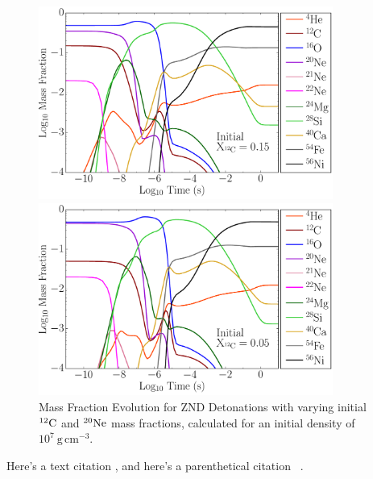 \documentclass[iop,apj]{emulateapj}
\newcommand{\C}[1]{\ensuremath{{}^{#1}{\rm C}}}
\newcommand{\Ne}[1]{\ensuremath{{}^{#1}{\rm Ne}}}
\newcommand{\unitspace}{\ensuremath{\,}}
\newcommand{\usp}{\unitspace}
\newcommand{\unitstyle}[1]{\ensuremath{\mathrm{#1}}}
\newcommand{\power}[2]{\ensuremath{{#1}^{#2}}}
\newcommand{\centi}{\unitstyle{c}}
\newcommand{\meter}{\unitstyle{m}}
\newcommand{\cm}{\centi\meter}
\newcommand{\gram}{\unitstyle{g}}
\newcommand{\grampercc}{\gram\usp\power{\cm}{-3}} %
\begin{document}
\begin{figure}[t]
	\hfill
	\begin{minipage}{0.5\textwidth}
		\includegraphics[width=0.86\textwidth]{figures/samples/XvsT_wn_35_XC-15.pdf}
	\end{minipage}
	\hfill
	\begin{minipage}{0.5\textwidth}
		\includegraphics[width=0.86\textwidth]{figures/samples/XvsT_wn_45_XC-05.pdf}
	\end{minipage}
        \caption{\label{fig:znd_abundances} Mass Fraction Evolution for ZND Detonations with varying initial \C{12} and \Ne{20} mass fractions, calculated for an initial density of $10^7~\grampercc$.}
\end{figure}

Here's a text citation \citet{timmes92,Chametal08}, and here's a parenthetical citation ~\citep{timmes.swesty:accuracy,castro1}.
\end{document}
